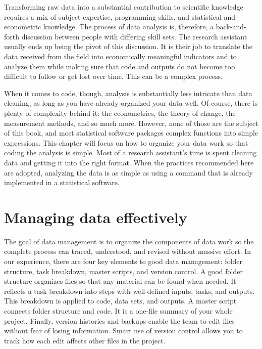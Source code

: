 
\begin{fullwidth}
Transforming raw data into a substantial contribution to scientific knowledge
requires a mix of subject expertise, programming skills,
and statistical and econometric knowledge.
The process of data analysis is, therefore,
a back-and-forth discussion between people
with differing skill sets.
The research assistant usually ends up being the pivot of this discussion.
It is their job to translate the data received from the field into
economically meaningful indicators and to analyze them
while making sure that code and outputs do not become too difficult to follow or get lost over time.
This can be a complex process.

When it comes to code, though, analysis is substantially less intricate than data cleaning,
as long as you have already organized your data well.
Of course, there is plenty of complexity behind it:
the econometrics, the theory of change, the measurement methods, and so much more.
However, none of those are the subject of this book,
and most statistical software packages complex functions into simple expressions.
This chapter will focus on how to organize your data work so that coding the analysis is simple.
Most of a research assistant's time is spent cleaning data and getting it into the right format.
When the practices recommended here are adopted,
analyzing the data is as simple as using a command that is already implemented in a statistical software.

\end{fullwidth}


\section{Managing data effectively}

The goal of data management is to organize the components of data work
so the complete process can traced, understood, and revised without massive effort.
In our experience, there are four key elements to good data management:
folder structure, task breakdown, master scripts, and version control.
A good folder structure organizes files so that any material can be found when needed.
It reflects a task breakdown into steps with well-defined inputs, tasks, and outputs.
This breakdown is applied to code, data sets, and outputs.
A master script connects folder structure and code.
It is a one-file summary of your whole project.
Finally, version histories and backups enable the team
to edit files without fear of losing information.
Smart use of version control allows you to track
how each edit affects other files in the project.

